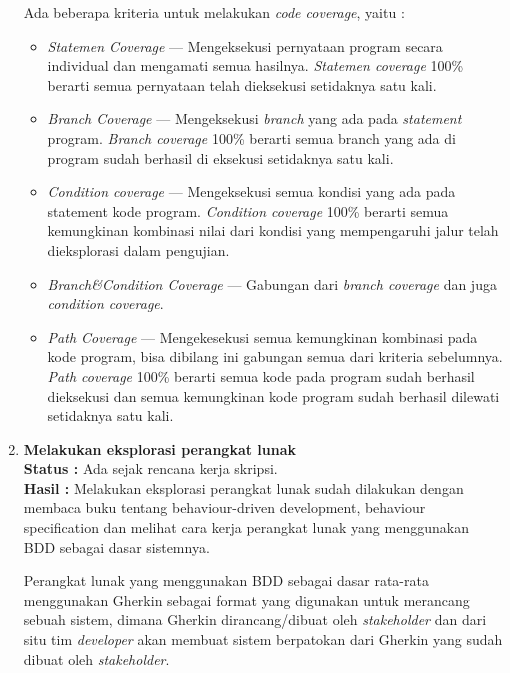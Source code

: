\documentclass[a4paper,twoside]{article}
\begin{document}
\begin{enumerate}
Ada beberapa kriteria untuk melakukan \textit{code coverage}, yaitu :
\begin{itemize}
\item \textit{Statemen Coverage} --- Mengeksekusi pernyataan program secara individual dan mengamati semua hasilnya. \textit{Statemen coverage} 100\% berarti semua pernyataan telah dieksekusi setidaknya satu kali.
\item \textit{Branch Coverage} --- Mengeksekusi \textit{branch} yang ada pada \textit{statement} program. \textit{Branch coverage} 100\% berarti semua branch yang ada di program sudah berhasil di eksekusi setidaknya satu kali.
\item \textit{Condition coverage} --- Mengeksekusi semua kondisi yang ada pada statement kode program.
\textit{Condition coverage} 100\% berarti semua kemungkinan kombinasi nilai dari kondisi yang mempengaruhi jalur telah dieksplorasi dalam  pengujian.
\item \textit{Branch\&Condition Coverage} --- Gabungan dari \textit{branch coverage} dan juga \textit{condition coverage}.
\item \textit{Path Coverage} --- Mengekesekusi semua kemungkinan kombinasi pada kode program, bisa dibilang ini gabungan semua dari kriteria sebelumnya. \textit{Path coverage} 100\% berarti semua kode pada program sudah berhasil dieksekusi dan semua kemungkinan kode program sudah berhasil dilewati setidaknya satu kali.
\end{itemize}
		
		\item \textbf{Melakukan eksplorasi perangkat lunak}\\
		{\bf Status :} Ada sejak rencana kerja skripsi.\\
		{\bf Hasil :} Melakukan eksplorasi perangkat lunak sudah dilakukan dengan membaca buku tentang behaviour-driven development, behaviour specification dan melihat cara kerja perangkat lunak yang menggunakan BDD sebagai dasar sistemnya.
		
Perangkat lunak yang menggunakan BDD sebagai dasar rata-rata menggunakan Gherkin sebagai format yang digunakan untuk merancang sebuah sistem, dimana Gherkin dirancang/dibuat oleh \textit{stakeholder} dan dari situ tim \textit{developer} akan membuat sistem berpatokan dari Gherkin yang sudah dibuat oleh \textit{stakeholder}.


\end{enumerate}
\end{document}

